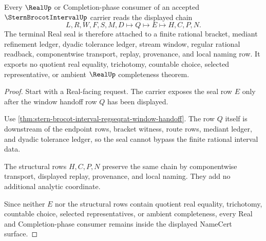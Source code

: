 \begin{theorem}
\label{thm:stern-brocot-interval-real-nonescape}
Every $\RealUp$ or Completion-phase consumer of an accepted $\SternBrocotIntervalUp$ carrier reads the displayed chain
$$
L,R,W,F,S,M,D \longmapsto Q \longmapsto E \longmapsto H,C,P,N .
$$
The terminal Real seal is therefore attached to a finite rational bracket, mediant refinement ledger, dyadic tolerance ledger, stream window, regular rational readback, componentwise transport, replay, provenance, and local naming row. It exports no quotient real equality, trichotomy, countable choice, selected representative, or ambient $\RealUp$ completeness theorem.
\end{theorem}
\begin{proof}
Start with a Real-facing request. The carrier exposes the seal row $E$ only after the window handoff row $Q$ has been displayed.

Use \autoref{thm:stern-brocot-interval-regseqrat-window-handoff}. The row $Q$ itself is downstream of the endpoint rows, bracket witness, route rows, mediant ledger, and dyadic tolerance ledger, so the seal cannot bypass the finite rational interval data.

The structural rows $H,C,P,N$ preserve the same chain by componentwise transport, displayed replay, provenance, and local naming. They add no additional analytic coordinate.

Since neither $E$ nor the structural rows contain quotient real equality, trichotomy, countable choice, selected representatives, or ambient completeness, every Real and Completion-phase consumer remains inside the displayed NameCert surface.
\end{proof}


